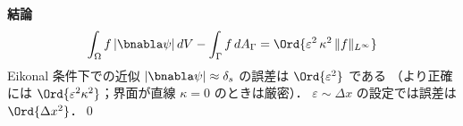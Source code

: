 \noindent\textbf{結論}
\[
  \int_\Omega f\,|\bnabla\psi|\,dV - \int_\Gamma f\,dA_\Gamma
  = \Ord{\varepsilon^2\,\kappa^2\,\|f\|_{L^\infty}}
\]
Eikonal 条件下での近似 $|\bnabla\psi| \approx \delta_s$ の誤差は $\Ord{\varepsilon^2}$ である
（より正確には $\Ord{\varepsilon^2\kappa^2}$；界面が直線 $\kappa=0$ のときは厳密）．
$\varepsilon \sim \Delta x$ の設定では誤差は $\Ord{\Delta x^2}$．\qed

